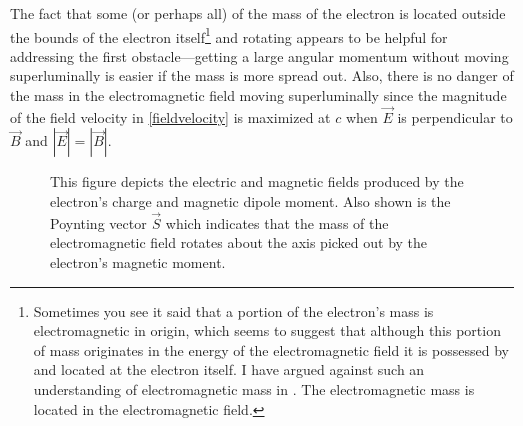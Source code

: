 \documentclass[12pt,secnumarabic,amsmath,amssymb,balancelastpage,nofootinbib]{article}
\begin{document}
The fact that some (or perhaps all) of the mass of the electron is located outside the bounds of the electron itself\footnote{Sometimes you see it said that a portion of the electron's mass is electromagnetic in origin, which seems to suggest that although this portion of mass originates in the energy of the electromagnetic field it is possessed by and located at the electron itself.  I have argued against such an understanding of electromagnetic mass in \citet{forcesonfields}.  The electromagnetic mass is located in the electromagnetic field.\label{whereisthemass}} and rotating appears to be helpful for addressing the first obstacle---getting a large angular momentum without moving superluminally is easier if the mass is more spread out.  Also, there is no danger of the mass in the electromagnetic field moving superluminally since the magnitude of the field velocity in \eqref{fieldvelocity} is maximized at $c$ when $\vec{E}$ is perpendicular to $\vec{B}$ and $|\vec{E}|=|\vec{B}|$.



\begin{figure}[htb]
\caption{This figure depicts the electric and magnetic fields produced by the electron's charge and magnetic dipole moment.  Also shown is the Poynting vector $\vec{S}$ which indicates that the mass of the electromagnetic field rotates about the axis picked out by the electron's magnetic moment.}
  \label{chargeddipole}
\end{figure}
\end{document}
